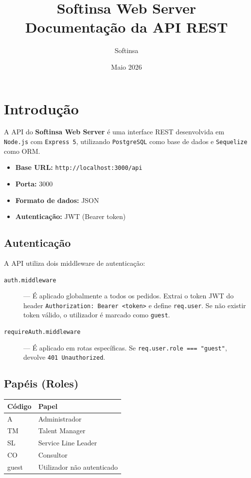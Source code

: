 \documentclass[12pt,a4paper]{article}
\title{\textbf{Softinsa Web Server} \\ \large Documentação da API REST}
\author{Softinsa}
\date{Maio 2026}
\begin{document}
\maketitle
\thispagestyle{empty}
\newpage

\tableofcontents
\newpage

\section{Introdução}

A API do \textbf{Softinsa Web Server} é uma interface REST desenvolvida em \texttt{Node.js} com \texttt{Express 5}, utilizando \texttt{PostgreSQL} como base de dados e \texttt{Sequelize} como ORM.

\begin{itemize}
    \item \textbf{Base URL:} \texttt{http://localhost:3000/api}
    \item \textbf{Porta:} 3000
    \item \textbf{Formato de dados:} JSON
    \item \textbf{Autenticação:} JWT (Bearer token)
\end{itemize}

\subsection{Autenticação}

A API utiliza dois middleware de autenticação:

\begin{description}
    \item[\texttt{auth.middleware}] --- É aplicado globalmente a todos os pedidos. Extrai o token JWT do header \texttt{Authorization: Bearer <token>} e define \texttt{req.user}. Se não existir token válido, o utilizador é marcado como \texttt{guest}.
    \item[\texttt{requireAuth.middleware}] --- É aplicado em rotas específicas. Se \texttt{req.user.role === "guest"}, devolve \texttt{401 Unauthorized}.
\end{description}

\subsection{Papéis (Roles)}

\begin{tabular}{ll}
    \toprule
    \textbf{Código} & \textbf{Papel} \\
    \midrule
    A  & Administrador \\
    TM & Talent Manager \\
    SL & Service Line Leader \\
    CO & Consultor \\
    guest & Utilizador não autenticado \\
    \bottomrule
\end{tabular}
\end{document}
